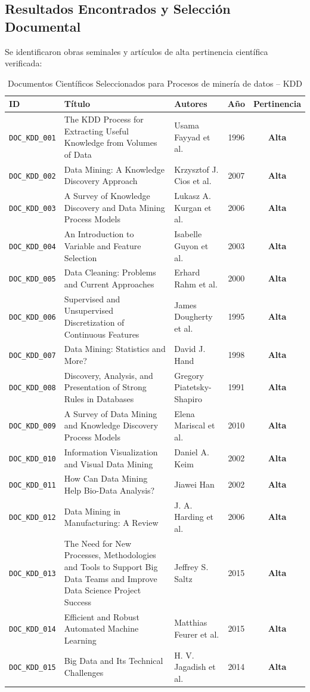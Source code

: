 \subsection{Resultados Encontrados y Selección Documental}
Se identificaron obras seminales y artículos de alta pertinencia científica verificada:
\begin{table}[H]
\centering
\scriptsize
\caption{Documentos Científicos Seleccionados para Procesos de minería de datos – KDD}
\begin{tabular}{p{1.8cm}p{4.5cm}p{3.2cm}cc}
\toprule
\textbf{ID} & \textbf{Título} & \textbf{Autores} & \textbf{Año} & \textbf{Pertinencia} \\
\midrule
\texttt{DOC_KDD_001} & The KDD Process for Extracting Useful Knowledge from Volumes of Data & Usama Fayyad et al. & 1996 & \textbf{Alta} \\
\texttt{DOC_KDD_002} & Data Mining: A Knowledge Discovery Approach & Krzysztof J. Cios et al. & 2007 & \textbf{Alta} \\
\texttt{DOC_KDD_003} & A Survey of Knowledge Discovery and Data Mining Process Models & Lukasz A. Kurgan et al. & 2006 & \textbf{Alta} \\
\texttt{DOC_KDD_004} & An Introduction to Variable and Feature Selection & Isabelle Guyon et al. & 2003 & \textbf{Alta} \\
\texttt{DOC_KDD_005} & Data Cleaning: Problems and Current Approaches & Erhard Rahm et al. & 2000 & \textbf{Alta} \\
\texttt{DOC_KDD_006} & Supervised and Unsupervised Discretization of Continuous Features & James Dougherty et al. & 1995 & \textbf{Alta} \\
\texttt{DOC_KDD_007} & Data Mining: Statistics and More? & David J. Hand & 1998 & \textbf{Alta} \\
\texttt{DOC_KDD_008} & Discovery, Analysis, and Presentation of Strong Rules in Databases & Gregory Piatetsky-Shapiro & 1991 & \textbf{Alta} \\
\texttt{DOC_KDD_009} & A Survey of Data Mining and Knowledge Discovery Process Models & Elena Mariscal et al. & 2010 & \textbf{Alta} \\
\texttt{DOC_KDD_010} & Information Visualization and Visual Data Mining & Daniel A. Keim & 2002 & \textbf{Alta} \\
\texttt{DOC_KDD_011} & How Can Data Mining Help Bio-Data Analysis? & Jiawei Han & 2002 & \textbf{Alta} \\
\texttt{DOC_KDD_012} & Data Mining in Manufacturing: A Review & J. A. Harding et al. & 2006 & \textbf{Alta} \\
\texttt{DOC_KDD_013} & The Need for New Processes, Methodologies and Tools to Support Big Data Teams and Improve Data Science Project Success & Jeffrey S. Saltz & 2015 & \textbf{Alta} \\
\texttt{DOC_KDD_014} & Efficient and Robust Automated Machine Learning & Matthias Feurer et al. & 2015 & \textbf{Alta} \\
\texttt{DOC_KDD_015} & Big Data and Its Technical Challenges & H. V. Jagadish et al. & 2014 & \textbf{Alta} \\
\bottomrule
\end{tabular}
\end{table}


